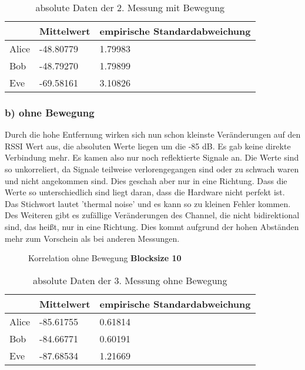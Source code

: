 \documentclass[12pt,a4paper]{article}
\begin{document}
\begin{table}[H]
\centering
\begin{tabular}{l|l|l}
& Mittelwert & empirische Standardabweichung \\
\hline
Alice & -48.80779 & 1.79983 \\
\hline
Bob & -48.79270 & 1.79899 \\
\hline
Eve & -69.58161 & 3.10826 \\
\end{tabular}
\caption{absolute Daten der 2. Messung mit Bewegung}
\end{table}

\subsubsection*{b) ohne Bewegung}
Durch die hohe Entfernung wirken sich nun schon kleinste Veränderungen auf den RSSI Wert aus, die absoluten Werte liegen um die -85 dB. Es gab keine direkte Verbindung mehr. Es kamen also nur noch reflektierte Signale an. Die Werte sind so unkorreliert, da Signale teilweise verlorengegangen sind oder zu schwach waren und nicht angekommen sind. Dies geschah aber nur in eine Richtung. Dass die Werte so unterschiedlich sind liegt daran, dass die Hardware nicht perfekt ist. Das Stichwort lautet 'thermal noise' und es kann so zu kleinen Fehler kommen. Des Weiteren gibt es zufällige Veränderungen des Channel, die nicht bidirektional sind, das heißt, nur in eine Richtung. Dies kommt aufgrund der hohen Abständen mehr zum Vorschein als bei anderen Messungen. 

\begin{figure}[H]
\centering
{} \qquad
{}
\caption{Korrelation ohne Bewegung \textbf{Blocksize 10}}
\label{fig:3_b_o}
\end{figure}

\begin{table}[H]
\centering
\begin{tabular}{l|l|l}
& Mittelwert & empirische Standardabweichung \\
\hline
Alice & -85.61755 & 0.61814 \\
\hline
Bob & -84.66771 & 0.60191 \\
\hline
Eve & -87.68534 & 1.21669 \\
\end{tabular}
\caption{absolute Daten der 3. Messung ohne Bewegung}
\end{table}
\end{document}
